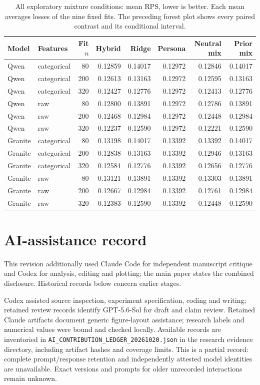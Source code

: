 \documentclass[10pt,twocolumn]{article}
\begin{document}
\begin{table}[H]\centering\small
\caption{All exploratory mixture conditions: mean RPS, lower is better.
Each mean averages losses of the nine fixed fits. The preceding forest plot
shows every paired contrast and its conditional interval.}
\begin{tabular}{@{}llrrrrrr@{}}\toprule
Model & Features & Fit $n$ & Hybrid & Ridge & Persona & Neutral mix & Prior mix\\\midrule
Qwen & categorical & 80 & 0.12859 & 0.14017 & 0.12972 & 0.12846 & 0.14017\\
Qwen & categorical & 200 & 0.12613 & 0.13163 & 0.12972 & 0.12595 & 0.13163\\
Qwen & categorical & 320 & 0.12427 & 0.12776 & 0.12972 & 0.12413 & 0.12776\\
Qwen & raw & 80 & 0.12800 & 0.13891 & 0.12972 & 0.12786 & 0.13891\\
Qwen & raw & 200 & 0.12468 & 0.12984 & 0.12972 & 0.12448 & 0.12984\\
Qwen & raw & 320 & 0.12237 & 0.12590 & 0.12972 & 0.12221 & 0.12590\\
Granite & categorical & 80 & 0.13198 & 0.14017 & 0.13392 & 0.13392 & 0.14017\\
Granite & categorical & 200 & 0.12838 & 0.13163 & 0.13392 & 0.12946 & 0.13163\\
Granite & categorical & 320 & 0.12584 & 0.12776 & 0.13392 & 0.12656 & 0.12776\\
Granite & raw & 80 & 0.13121 & 0.13891 & 0.13392 & 0.13303 & 0.13891\\
Granite & raw & 200 & 0.12667 & 0.12984 & 0.13392 & 0.12761 & 0.12984\\
Granite & raw & 320 & 0.12383 & 0.12590 & 0.13392 & 0.12448 & 0.12590\\
\bottomrule\end{tabular}\end{table}

\section{AI-assistance record}
This revision additionally used Claude Code for independent manuscript critique and Codex for analysis, editing and plotting; the main paper states the combined disclosure. Historical records below concern earlier stages.

Codex assisted source inspection, experiment specification, coding and writing;
retained review records identify GPT-5.6-Sol for draft and claim review.
Retained Claude artifacts document generic figure-layout assistance; research
labels and numerical values were bound and checked locally. Available records
are inventoried in \texttt{AI\_CONTRIBUTION\_LEDGER\_20261020.json} in the
research evidence directory, including artifact hashes and coverage limits.
This is a partial record: complete prompt/response retention and independently
attested model identities are unavailable. Exact versions and prompts for older
unrecorded interactions remain unknown.
\end{document}

